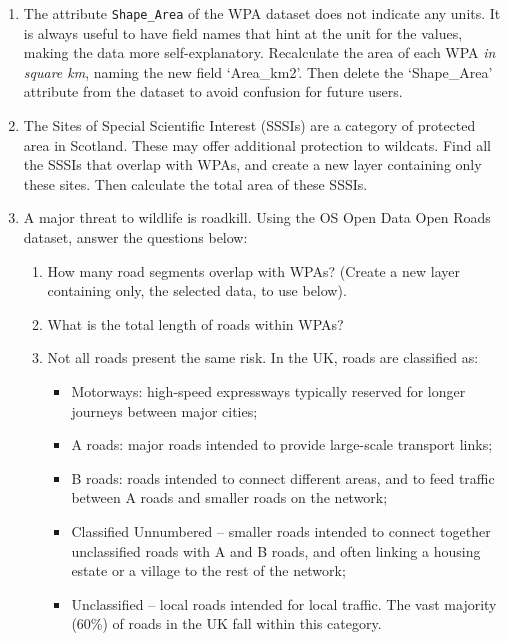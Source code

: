\documentclass[
  letterpaper,
  DIV=11,
  numbers=noendperiod]{scrreprt}
\providecommand{\tightlist}{%
  \setlength{\itemsep}{0pt}\setlength{\parskip}{0pt}}\usepackage{longtable,booktabs,array}
\begin{document}
\begin{enumerate}
\def\labelenumi{\arabic{enumi})}
\setcounter{enumi}{3}
\item
  The attribute \texttt{Shape\_Area} of the WPA dataset does not
  indicate any units. It is always useful to have field names that hint
  at the unit for the values, making the data more self-explanatory.
  Recalculate the area of each WPA \emph{in square km}, naming the new
  field `Area\_km2'. Then delete the `Shape\_Area' attribute from the
  dataset to avoid confusion for future users.
\item
  The Sites of Special Scientific Interest (SSSIs) are a category of
  protected area in Scotland. These may offer additional protection to
  wildcats. Find all the SSSIs that overlap with WPAs, and create a new
  layer containing only these sites. Then calculate the total area of
  these SSSIs.
\item
  A major threat to wildlife is roadkill. Using the OS Open Data Open
  Roads dataset, answer the questions below:

  \begin{enumerate}
  \def\labelenumii{\alph{enumii})}
  \item
    How many road segments overlap with WPAs? (Create a new layer
    containing only, the selected data, to use below).
  \item
    What is the total length of roads within WPAs?
  \item
    Not all roads present the same risk. In the UK, roads are classified
    as:

    \begin{itemize}
    \tightlist
    \item
      Motorways: high-speed expressways typically reserved for longer
      journeys between major cities;
    \item
      A roads: major roads intended to provide large-scale transport
      links;
    \item
      B roads: roads intended to connect different areas, and to feed
      traffic between A roads and smaller roads on the network;
    \item
      Classified Unnumbered -- smaller roads intended to connect
      together unclassified roads with A and B roads, and often linking
      a housing estate or a village to the rest of the network;
    \item
      Unclassified -- local roads intended for local traffic. The vast
      majority (60\%) of roads in the UK fall within this category.
    \end{itemize}
  \end{enumerate}
\end{enumerate}
\end{document}
